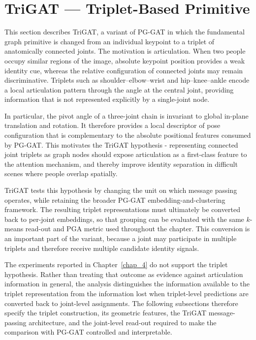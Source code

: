 \section{TriGAT --- Triplet-Based Primitive}
\label{sec_meth_trigat}

This section describes TriGAT,
a variant of PG-GAT in which the fundamental graph primitive
is changed from an individual keypoint to a triplet of anatomically
connected joints.
The motivation is articulation.
When two people occupy similar regions of the image,
absolute keypoint position provides a weak identity cue,
whereas the relative configuration of connected joints
may remain discriminative.
Triplets such as shoulder--elbow--wrist and hip--knee--ankle
encode a local articulation pattern through the angle at the central joint,
providing information that is not represented explicitly
by a single-joint node.

In particular, the pivot angle of a three-joint chain
is invariant to global in-plane translation and rotation.
It therefore provides a local descriptor of pose configuration
that is complementary to the absolute positional features
consumed by PG-GAT.
This motivates the TriGAT hypothesis -
representing connected joint triplets as graph nodes
should expose articulation as a first-class feature
to the attention mechanism,
and thereby improve identity separation in difficult scenes
where people overlap spatially.

TriGAT tests this hypothesis by changing the unit on which message
passing operates,
while retaining the broader PG-GAT embedding-and-clustering framework.
The resulting triplet representations must ultimately be converted back
to per-joint embeddings,
so that grouping can be evaluated with the same $k$-means read-out
and PGA metric used throughout the chapter.
This conversion is an important part of the variant,
because a joint may participate in multiple triplets
and therefore receive multiple candidate identity signals.

The experiments reported in Chapter~\ref{chap_4}
do not support the triplet hypothesis.
Rather than treating that outcome as evidence against articulation
information in general,
the analysis distinguishes the information available
to the triplet representation
from the information lost when triplet-level predictions
are converted back to joint-level assignments.
The following subsections therefore specify the triplet construction,
its geometric features,
the TriGAT message-passing architecture,
and the joint-level read-out required to make the comparison
with PG-GAT controlled and interpretable.

